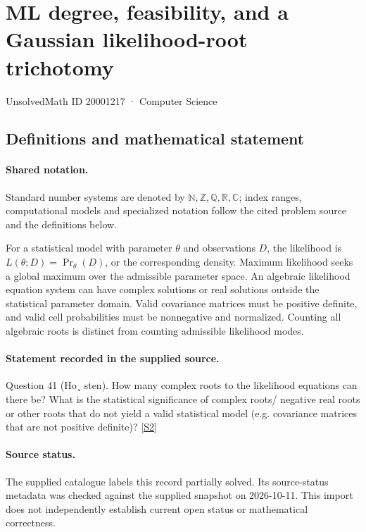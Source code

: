 \documentclass[11pt]{article}
\newcommand{\sref}[2]{\hyperlink{source:#1:#2}{[S#2]}}
\begin{document}
\setcounter{section}{20001216}
\section{ML degree, feasibility, and a Gaussian likelihood-root trichotomy}\label{20001217}
{\small\sffamily UnsolvedMath ID 20001217 · Computer Science}
\subsection{Definitions and mathematical statement}

\paragraph{Shared notation.}Standard number systems are denoted by $\mathbb N,\mathbb Z,\mathbb Q,\mathbb R,\mathbb C$; index ranges, computational models and specialized notation follow the cited problem source and the definitions below.


For a statistical model with parameter $\theta$ and observations $D$, the likelihood is $L(\theta;D)=\Pr_\theta(D)$, or the corresponding density. Maximum likelihood seeks a global maximum over the admissible parameter space. An algebraic likelihood equation system can have complex solutions or real solutions outside the statistical parameter domain. Valid covariance matrices must be positive definite, and valid cell probabilities must be nonnegative and normalized. Counting all algebraic roots is distinct from counting admissible likelihood modes.
\paragraph{Statement recorded in the supplied source.}
Question 41 (Ho¸ sten). How many complex roots to the likelihood equations can there be? What is the statistical significance of complex roots/ negative real roots or other roots that do not yield a valid statistical model (e.g. covariance matrices that are not positive definite)? \sref{20001217}{2}
\paragraph{Source status.}
The supplied catalogue labels this record partially solved. Its source-status metadata was checked against the supplied snapshot on 2026-10-11. This import does not independently establish current open status or mathematical correctness.
\end{document}
